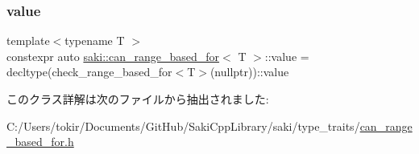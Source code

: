 \subsubsection{\texorpdfstring{value}{value}}
{\footnotesize\ttfamily template$<$typename T $>$ \\
constexpr auto \mbox{\hyperlink{classsaki_1_1can__range__based__for}{saki\+::can\+\_\+range\+\_\+based\+\_\+for}}$<$ T $>$\+::value = decltype(check\+\_\+range\+\_\+based\+\_\+for$<$T$>$(nullptr))\+::value\hspace{0.3cm}{\ttfamily [static]}}



このクラス詳解は次のファイルから抽出されました\+:\begin{DoxyCompactItemize}
\item 
C\+:/\+Users/tokir/\+Documents/\+Git\+Hub/\+Saki\+Cpp\+Library/saki/type\+\_\+traits/\mbox{\hyperlink{can__range__based__for_8h}{can\+\_\+range\+\_\+based\+\_\+for.\+h}}\end{DoxyCompactItemize}
